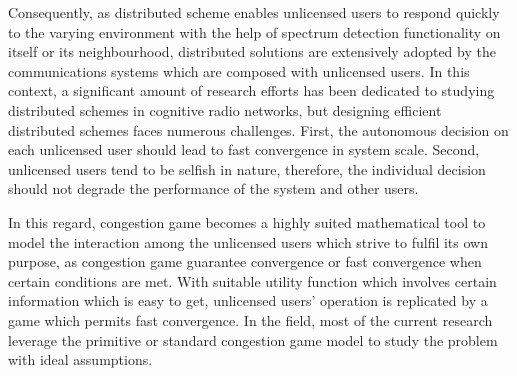 Consequently, as distributed scheme enables unlicensed users to respond quickly to the varying environment with the help of spectrum detection functionality on itself or its neighbourhood, distributed solutions are extensively adopted by the communications systems which are composed with unlicensed users.
%
%
%
In this context, a significant amount of research efforts has been dedicated to studying distributed schemes in cognitive radio networks, but designing efficient distributed schemes faces numerous challenges.
First, the autonomous decision on each unlicensed user should lead to fast convergence in system scale.
Second, unlicensed users tend to be selfish in nature, therefore, the individual decision should not degrade the performance of the system and other users.

In this regard, congestion game becomes a highly suited mathematical tool to model the interaction among the unlicensed users which strive to fulfil its own purpose, as congestion game guarantee convergence or fast convergence when certain conditions are met.
With suitable utility function which involves certain information which is easy to get, unlicensed users' operation is replicated by a game which permits fast convergence.
In the field, most of the current research leverage the primitive or standard congestion game model to study the problem with ideal assumptions. 

